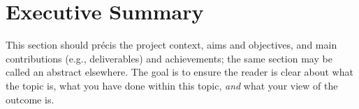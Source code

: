 \documentclass[ %
                    author={Lucas O'Dowd-Jones},
                supervisor={Dr. Alex Kavvos},
                    degree={MEng},
                     title={Variations on Normalisation by Evaluation in Haskell},
                  subtitle={},
                      type={programming languages},
                      year={2021} ]{dissertation}
\begin{document}



\maketitle


\frontmatter


\makedecl


\tableofcontents
\listoffigures
\listoftables
\listofalgorithms
\lstlistoflistings



\chapter*{Executive Summary}


\noindent
This section should pr\'{e}cis the project context, aims and objectives,
and main contributions (e.g., deliverables) and achievements; the same 
section may be called an abstract elsewhere.  The goal is to ensure the 
reader is clear about what the topic is, what you have done within this 
topic, {\em and} what your view of the outcome is.
\end{document}

